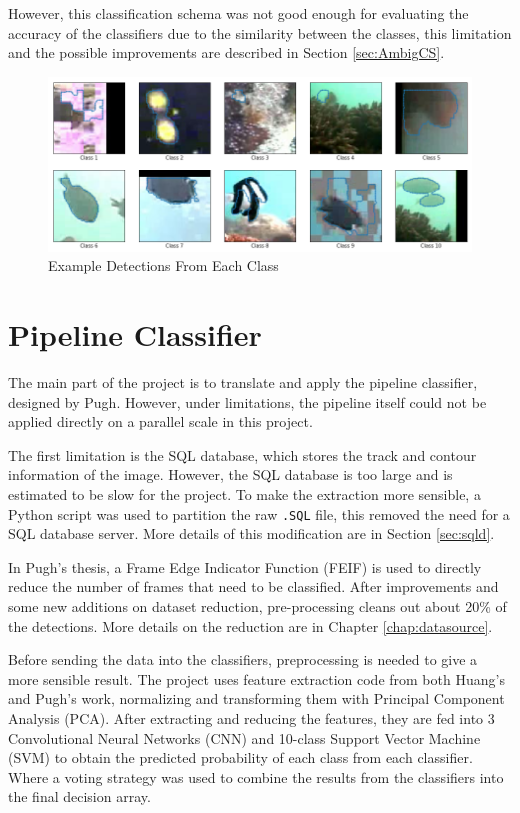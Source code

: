 \documentclass[bsc,logo,twoside,fullspacing,parskip]{infthesis}
\begin{document}
However, this classification schema was not good enough for evaluating the accuracy of the classifiers due to the similarity between the classes, this limitation and the possible improvements are described in Section \ref{sec:AmbigCS}.

\begin{figure}
    \centering
    \includegraphics[scale=0.4]{graph/class_sample.png}
    \caption{Example Detections From Each Class}
    \label{fig:classes}
\end{figure}

\section{Pipeline Classifier}

The main part of the project is to translate and apply the pipeline classifier, designed by Pugh\cite{Pugh}. 
However, under limitations, the pipeline itself could not be applied directly on a parallel scale in this project.

The first limitation is the SQL database, which stores the track and contour information of the image. 
However, the SQL database is too large and is estimated to be slow for the project.
To make the extraction more sensible, a Python script was used to partition the raw {\tt .SQL} file, this removed the need for a SQL database server. 
More details of this modification are in Section \ref{sec:sqld}.

In Pugh's thesis\cite{Pugh}, a Frame Edge Indicator Function (FEIF) is used to directly reduce the number of frames that need to be classified. 
After improvements and some new additions on dataset reduction, pre-processing cleans out about 20\% of the detections. More details on the reduction are in Chapter \ref{chap:datasource}.

Before sending the data into the classifiers, preprocessing is needed to give a more sensible result.
The project uses feature extraction code from both Huang's\cite{Huang} and Pugh's\cite{Pugh} work, normalizing and transforming them with Principal Component Analysis (PCA).
After extracting and reducing the features, they are fed into 3 Convolutional Neural Networks (CNN) and 10-class Support Vector Machine (SVM) to obtain the predicted probability of each class from each classifier.
Where a voting strategy was used to combine the results from the classifiers into the final decision array.
\end{document}
